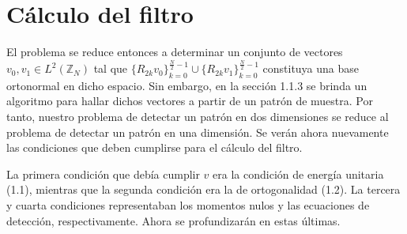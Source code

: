 \section{C\'alculo del filtro}

\par El problema se reduce entonces a determinar un conjunto de vectores $v_0,v_1\in L^2(\mathbb{Z}_N)$ tal que $\{R_{2k}v_0\}_{k=0}^{\frac{N}{2}-1}\cup\{R_{2k}v_1\}_{k=0}^{\frac{N}{2}-1}$ constituya una base ortonormal en dicho espacio. Sin embargo, en la secci\'on 1.1.3 se brinda un algoritmo para hallar dichos vectores a partir de un patr\'on de muestra. Por tanto, nuestro problema de detectar un patr\'on en dos dimensiones se reduce al problema de detectar un patr\'on en una dimensi\'on. Se ver\'an ahora nuevamente las condiciones que deben cumplirse para el c\'alculo del filtro.\\

\par La primera condici\'on que deb\'ia cumplir $v$ era la condici\'on de energ\'ia unitaria (1.1), mientras que la segunda condici\'on era la de ortogonalidad (1.2). La tercera y cuarta condiciones representaban los momentos nulos y las ecuaciones de detecci\'on, respectivamente. Ahora se profundizar\'an en estas \'ultimas.

